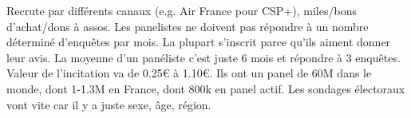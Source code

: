 Recrute par différents canaux (e.g. Air France pour CSP+), miles/bons d'achat/dons à assos. Les panelistes ne doivent pas répondre à un nombre déterminé d'enquêtes par mois. La plupart s'inscrit parce qu'ils aiment donner leur avis. La moyenne d'un panéliste c'est juste 6 mois et répondre à 3 enquêtes. Valeur de l'incitation va de 0.25€ à 1.10€. Ils ont un panel de 60M dans le monde, dont 1-1.3M en France, dont 800k en panel actif. Les sondages électoraux vont vite car il y a juste sexe, âge, région. 